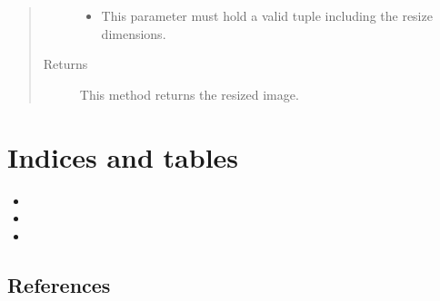 \documentclass[letterpaper,10pt,english]{sphinxmanual}
\begin{document}
\begin{fulllineitems}
\begin{fulllineitems}
\begin{quote}
\begin{description}
\begin{itemize}
\item {} 
 \textendash{} This parameter must hold a valid tuple including the resize dimensions.

\end{itemize}

\item[{Returns}] \leavevmode
This method returns the resized image.

\end{description}\end{quote}

\end{fulllineitems}


\end{fulllineitems}



\chapter{Indices and tables}
\label{\detokenize{index:indices-and-tables}}\begin{itemize}
\item {} 

\item {} 

\item {} 

\end{itemize}


\section{References}
\label{\detokenize{index:references}}


\renewcommand{\indexname}{Index}
\printindex
\end{document}
